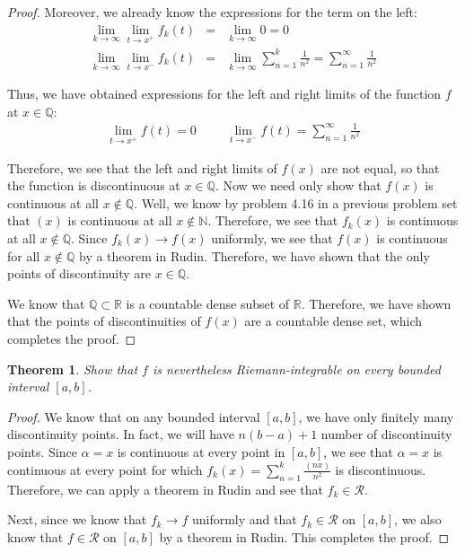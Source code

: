 \documentclass[psamsfonts]{amsart}
\newtheorem{thm}{Theorem}[section]
\theoremstyle{definition}
\theoremstyle{remark}
\numberwithin{equation}{section}
\begin{document}
\begin{proof}
Moreover, we already know the expressions for the term on the left:
\begin{eqnarray}
\lim_{k \to \infty} \lim_{t \to x^{+}} f_k(t) &=& \lim_{k \to \infty} 0 = 0 \\
\lim_{k \to \infty} \lim_{t \to x^{-}} f_k(t) &=& \lim_{k \to \infty} \sum_{n=1}^k \frac{1}{n^2} = \sum_{n=1}^\infty \frac{1}{n^2}
\end{eqnarray}

Thus, we have obtained expressions for the left and right limits of the function $f$ at $x \in \mathbb{Q}$:
\begin{eqnarray}
\lim_{t \to x^{+}} f(t) = 0 \hspace{1cm}  \lim_{t \to x^{-}} f(t) = \sum_{n=1}^\infty \frac{1}{n^2}
\end{eqnarray}

Therefore, we see that the left and right limits of $f(x)$ are not equal, so that the function is discontinuous at $x \in \mathbb{Q}$. Now we need only show that $f(x)$ is continuous at all $x \notin \mathbb{Q}$. Well, we know by problem 4.16 in a previous problem set that $(x)$ is continuous at all $x \notin \mathbb{N}$. Therefore, we see that $f_k(x)$ is continuous at all $x \notin \mathbb{Q}$. Since $f_k(x) \to f(x)$ uniformly, we see that $f(x)$ is continuous for all $x \notin \mathbb{Q}$ by a theorem in Rudin. Therefore, we have shown that the only points of discontinuity are $x \in \mathbb{Q}$.

We know that $\mathbb{Q} \subset \mathbb{R}$ is a countable dense subset of $\mathbb{R}$. Therefore, we have shown that the points of discontinuities of $f(x)$ are a countable dense set, which completes the proof.
\end{proof}

\begin{thm}
Show that $f$ is nevertheless Riemann-integrable on every bounded interval $[a,b]$.
\end{thm}

\begin{proof}
We know that on any bounded interval $[a,b]$, we have only finitely many discontinuity points. In fact, we will have $n(b-a) + 1$ number of discontinuity points. Since $\alpha = x$ is continuous at every point in $[a,b]$, we see that $\alpha = x$ is continuous at every point for which $f_k(x) = \sum_{n=1}^k \frac{(nx)}{n^2}$ is discontinuous. Therefore, we can apply a theorem in Rudin and see that $f_k \in \mathscr{R}$. 

Next, since we know that $f_k \to f$ uniformly and that $f_k \in \mathscr{R}$ on $[a,b]$, we also know that $f \in \mathscr{R}$ on $[a,b]$ by a theorem in Rudin. This completes the proof.
\end{proof}
\end{document}
